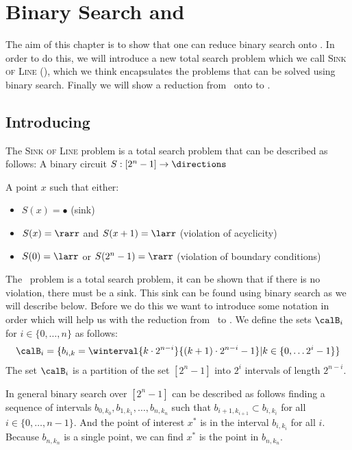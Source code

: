 \setchapterpreamble[u]{\margintoc}
\chapter{Binary Search and \EOPL}

The aim of this chapter is to show that one can reduce binary search onto \EOPL.
In order to do this, we will introduce a new total search problem which we call \textsc{Sink of Line} (\SOL), which we think encapsulates the problems that can
be solved using binary search.
Finally we will show a reduction from \SOL\ onto to \EOPL.

\section{Introducing \SOL}

The \textsc{Sink of Line} problem is a total search problem that can be described as follows:
{A binary circuit $S : [2^n - 1] \rightarrow \directions $}
{A point $x$ such that either:
\begin{itemize}
    \item $S(x) = \bullet$ (sink)
    \item $S(x) = \rarr$ and $S(x+1) = \larr$ (violation of acyclicity)
    \item $S(0) = \larr$ or $S(2^n - 1) = \rarr $ (violation of boundary conditions)
\end{itemize}
}

The \SOL\ problem is a total search problem, it can be shown that if there is no violation, there must be a sink.
This sink can be found using binary search as we will describe below.
Before we do this we want to introduce some notation in order which will help us with the reduction from \SOL\ to \EOPL.
We define the sets $\calB_i$ for $i \in \{0, \dots, n\}$ as follows:
\begin{align*}
    \calB_i = \{ b_{i, k} = \winterval{k \cdot 2^{n-i}}{(k+1) \cdot 2^{n-i} - 1} | k \in \{0, \dots 2^i - 1\} \}
\end{align*}
The set $\calB_i$ is a partition of the set $[2^n - 1]$ into $2^i$ intervals of length $2^{n-i}$.

In general binary search over $[2^n - 1]$ can be described as follows finding a sequence of intervals $b_{0, k_0}, b_{1, k_1}, \dots, b_{n, k_{n}}$ such
that $b_{i+1, k_{i+1}} \subset b_{i, k_i}$ for all $i \in \{0, \dots, n-1\}$.
And the point of interest $x^*$ is in the interval $b_{i, k_i}$ for all $i$.
Because $b_{n, k_n}$ is a single point, we can find $x^*$ is the point in $b_{n, k_n}$.

